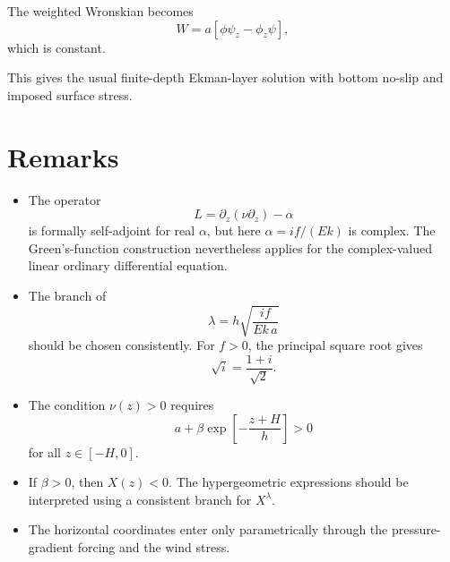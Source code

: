 \documentclass[10pt]{amsart}
\begin{document}
The weighted Wronskian becomes
\begin{equation}
W
=
a
\left[
\phi\psi_z-\phi_z\psi
\right],
\end{equation}
which is constant.

This gives the usual finite-depth Ekman-layer solution with bottom no-slip and imposed surface stress.

\section{Remarks}

\begin{itemize}
    \item The operator
    \[
    L=\partial_z(\nu\partial_z)-\alpha
    \]
    is formally self-adjoint for real \(\alpha\), but here \(\alpha=i f/(E k)\) is complex. The Green's-function construction nevertheless applies for the complex-valued linear ordinary differential equation.

    \item The branch of
    \[
    \lambda=h\sqrt{\frac{i f}{E k\,a}}
    \]
    should be chosen consistently. For \(f>0\), the principal square root gives
    \[
    \sqrt{i}=\frac{1+i}{\sqrt{2}}.
    \]

    \item The condition \(\nu(z)>0\) requires
    \[
    a+\beta \exp\!\left[-\frac{z+H}{h}\right]>0
    \]
    for all \(z\in[-H,0]\).

    \item If \(\beta>0\), then \(X(z)<0\). The hypergeometric expressions should be interpreted using a consistent branch for \(X^\lambda\).

    \item The horizontal coordinates enter only parametrically through the pressure-gradient forcing and the wind stress.
\end{itemize}
\end{document}
